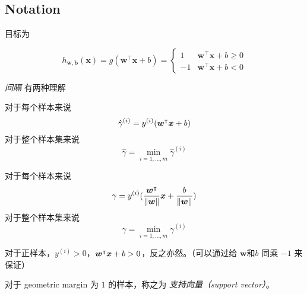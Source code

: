 \subsection{Notation}
	目标为
	\begin{df}
		\begin{equation*}
			h_{\bm{w},\bm{b}} (\bm{x}) = g( \bm{w}^\intercal \bm{x} + b ) = 
			\begin{cases}
				1 	& \bm{w}^\intercal \bm{x} + b \geq 0 \\
				-1 	& \bm{w}^\intercal \bm{x} + b < 0
			\end{cases}
		\end{equation*}			
	\end{df}
	
	\emph{间隔} 有两种理解
	\begin{df}
		对于每个样本来说
		\begin{equation*}
			\hat{\gamma}^{(i)} = y^{(i)} (\bm{w^}\intercal \bm{x} + b)
		\end{equation*}
		对于整个样本集来说
		\begin{equation*}
			\hat{\gamma} = \min_{i=1,\ldots,m}{\hat{\gamma}^{(i)}}
		\end{equation*}
	\end{df}
	\begin{df}
		对于每个样本来说
		\begin{equation*}
			\gamma = y^{(i)} (\frac{\bm{w^}\intercal}{\| \bm{w} \|} \bm{x} + \frac{b}{\| \bm{w} \|})			
		\end{equation*}
		对于整个样本集来说
			\begin{equation*}
				\gamma = \min_{i=1,\ldots,m}{\gamma^{(i)}}
			\end{equation*}	
	\end{df}
	
	对于正样本，$ y^{(i)} > 0 $，$ \bm{w^}\intercal \bm{x} + b > 0$，反之亦然。（可以通过给 $ \bm{w} \text{和} b$ 同乘 $ -1 $ 来保证）
	
	对于 geometric margin 为 $ 1 $ 的样本，称之为 \emph{支持向量（support vector）}。
	
